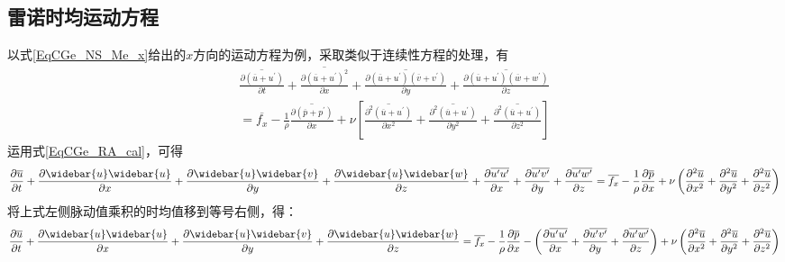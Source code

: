 \subsection{雷诺时均运动方程}
以式\eqref{EqCGe_NS_Me_x}给出的$x$方向的运动方程为例，采取类似于连续性方程的处理，有
\begin{equation*}
  \begin{aligned}
    \overline{
      \frac{\partial (\overline{u}+u^{\prime})}{\partial t}
    }
    +
    \overline{
      \frac{\partial (\overline{u}+u^{\prime})^{2}}{\partial x}
    }
    +
    \overline{
      \frac{\partial (\overline{u}+u^{\prime})(\overline{v}+v^{\prime})}{\partial y}
    }
    +
    \overline{
      \frac{\partial (\overline{u}+u^{\prime})(\overline{w}+w^{\prime})}{\partial z}
    }
    \\
    =
    \overline{f_{x}}
    -\frac{1}{\rho}
    \overline{
      \frac{\partial (\overline{p}+p^{\prime})}{\partial x}
    }
    +
    \nu
    \left[
      \overline{
        \frac{\partial^{2} (\overline{u}+u^{\prime})}{\partial x^{2}}
      }
      +
      \overline{
        \frac{\partial^{2} (\overline{u}+u^{\prime})}{\partial y^{2}}
      }
      +
      \overline{
        \frac{\partial^{2} (\overline{u}+u^{\prime})}{\partial z^{2}}
      }
    \right]
  \end{aligned}
\end{equation*}
运用式\eqref{EqCGe_RA_cal}，可得
\begin{equation*}
  \frac{\partial \overline{u}}{\partial t} +
  \frac{\partial \widebar{u}\widebar{u}}{\partial x} +
  \frac{\partial \widebar{u}\widebar{v}}{\partial y} +
  \frac{\partial \widebar{u}\widebar{w}}{\partial z} +
  \frac{\partial \overline{u^{\prime}u^{\prime}}}{\partial x} +
  \frac{\partial \overline{u^{\prime}v^{\prime}}}{\partial y} +
  \frac{\partial \overline{u^{\prime}w^{\prime}}}{\partial z}
  =
  \overline{f_{x}}
  -\frac{1}{\rho}\frac{\partial \overline{p}}{\partial x} +
  \nu
  \left(
  \frac{\partial^{2} \overline{u}}{\partial x^{2}} +
  \frac{\partial^{2} \overline{u}}{\partial y^{2}} +
  \frac{\partial^{2} \overline{u}}{\partial z^{2}}
  \right)
\end{equation*}
将上式左侧脉动值乘积的时均值移到等号右侧，得：
\begin{equation}
  \frac{\partial \overline{u}}{\partial t} +
  \frac{\partial \widebar{u}\widebar{u}}{\partial x} +
  \frac{\partial \widebar{u}\widebar{v}}{\partial y} +
  \frac{\partial \widebar{u}\widebar{w}}{\partial z}
  =
  \overline{f_{x}}
  -\frac{1}{\rho}\frac{\partial \overline{p}}{\partial x} -
  \left(
  \frac{\partial \overline{u^{\prime}u^{\prime}}}{\partial x} +
  \frac{\partial \overline{u^{\prime}v^{\prime}}}{\partial y} +
  \frac{\partial \overline{u^{\prime}w^{\prime}}}{\partial z}
  \right)
  +
  \nu
  \left(
  \frac{\partial^{2} \overline{u}}{\partial x^{2}} +
  \frac{\partial^{2} \overline{u}}{\partial y^{2}} +
  \frac{\partial^{2} \overline{u}}{\partial z^{2}}
  \right)
  \label{EqCGe_Ra_Me_temp1}
\end{equation}
